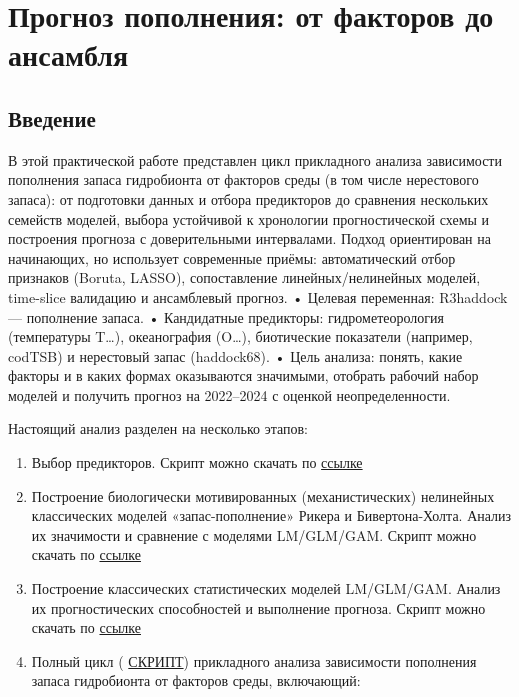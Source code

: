 \documentclass[
  letterpaper,
  DIV=11,
  numbers=noendperiod]{scrreprt}
\begin{document}

\chapter{Прогноз пополнения: от факторов до
ансамбля}\label{ux43fux440ux43eux433ux43dux43eux437-ux43fux43eux43fux43eux43bux43dux435ux43dux438ux44f-ux43eux442-ux444ux430ux43aux442ux43eux440ux43eux432-ux434ux43e-ux430ux43dux441ux430ux43cux431ux43bux44f}

\section{Введение}\label{ux432ux432ux435ux434ux435ux43dux438ux435-6}

В этой практической работе представлен цикл прикладного анализа
зависимости пополнения запаса гидробионта от факторов среды (в том числе
нерестового запаса): от подготовки данных и отбора предикторов до
сравнения нескольких семейств моделей, выбора устойчивой к хронологии
прогностической схемы и построения прогноза с доверительными
интервалами. Подход ориентирован на начинающих, но использует
современные приёмы: автоматический отбор признаков (Boruta, LASSO),
сопоставление линейных/нелинейных моделей, time-slice валидацию и
ансамблевый прогноз. • Целевая переменная: R3haddock --- пополнение
запаса. • Кандидатные предикторы: гидрометеорология (температуры
T\ldots), океанография (O\ldots), биотические показатели (например,
codTSB) и нерестовый запас (haddock68). • Цель анализа: понять, какие
факторы и в каких формах оказываются значимыми, отобрать рабочий набор
моделей и получить прогноз на 2022--2024 с оценкой неопределенности.

Настоящий анализ разделен на несколько этапов:

\begin{enumerate}
\def\labelenumi{\arabic{enumi})}
\item
  Выбор предикторов. Скрипт можно скачать по
  \href{https://mombus.github.io/cRab/data/RECRUITMENT_PREDICTORS.R}{ссылке}
\item
  Построение биологически мотивированных (механистических) нелинейных
  классических моделей «запас-пополнение» Рикера и Бивертона-Холта.
  Анализ их значимости и сравнение с моделями LM/GLM/GAM. Скрипт можно
  скачать по
  \href{https://mombus.github.io/cRab/data/RECRUITMENT_CLASSIC.R}{ссылке}
\item
  Построение классических статистических моделей LM/GLM/GAM. Анализ их
  прогностических способностей и выполнение прогноза. Скрипт можно
  скачать по
  \href{https://mombus.github.io/cRab/data/RECRUITMENT_LM_GLM_GAM.R}{ссылке}
\item
  Полный цикл (
  \href{https://mombus.github.io/cRab/data/RECRUITMENT_MAIN.R}{СКРИПТ})
  прикладного анализа зависимости пополнения запаса гидробионта от
  факторов среды, включающий:
\end{enumerate}
\end{document}
